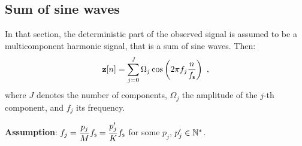 \subsection{Sum of sine waves}

In that section, the deterministic part of the observed signal is assumed to be a multicomponent harmonic signal, that is a sum of sine waves. Then:
\begin{equation}
{\mathbf z}[n]=\sum_{j=0}^J\Omega_j\cos\left(2\pi f_j \frac{n}{f_{\mathsf s}}\right)\ ,
\label{eq:sum.sine}
\end{equation}
where $J$ denotes the number of components, $\Omega_j$ the amplitude of the $j$-th component, and $f_j$ its frequency.

{\bf Assumption}: $f_j = \dfrac{p_j}{M}f_{\mathsf s} = \dfrac{p'_j}{K}f_{\mathsf s}$ for some $p_j$, $p'_j\in\mathbb N^*$.

